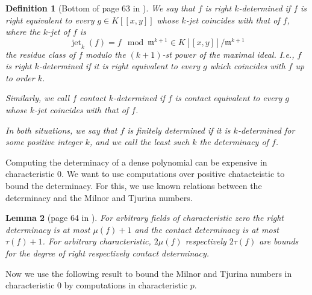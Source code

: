 \documentclass[a4paper,11pt,reqno]{amsart}%
\theoremstyle{definition}
\theoremstyle{plain}
\newtheorem{definition}{Definition}[section]
\newtheorem{lemma}[definition]{Lemma}
\theoremstyle{remark}
\begin{document}
\begin{definition}[Bottom of page 63 in \cite{Boubakri2012}]
We say that \( f \) is \emph{right \( k \)-determined} if \( f \) is right equivalent to every \( g \in K[[x,y]] \) whose \( k \)-jet coincides with that of \( f \), where the \( k \)-jet of \( f \) is
\[
\operatorname{jet}_k(f) = f \mod \mathfrak{m}^{k+1} \in K[[x,y]] / \mathfrak{m}^{k+1}
\]
the residue class of \( f \) modulo the \( (k+1) \)-st power of the maximal ideal. I.e., \( f \) is right \( k \)-determined if it is right equivalent to every \( g \) which coincides with \( f \) up to order \( k \).

Similarly, we call \( f \) \emph{contact \( k \)-determined} if \( f \) is contact equivalent to every \( g \) whose \( k \)-jet coincides with that of \( f \).

In both situations, we say that \( f \) is \emph{finitely determined} if it is \( k \)-determined for some positive integer \( k \), and we call the least such \( k \) the \emph{determinacy} of \( f \).
\end{definition}



%

Computing the determinacy of a dense polynomial can be expensive in characteristic 0. We want to use computations over positive chatacteistic to bound the determinacy. For this, we use known relations between the determinacy and the Milnor and Tjurina numbers.

\begin{lemma}[page 64 in \cite{Boubakri2012}]
For arbitrary fields of characteristic zero the right determinacy is at most $\mu(f) + 1$ and the contact determinacy is at
most $\tau(f)+1$. For arbitrary characteristic, $2\mu(f)$ respectively $2\tau(f)$ are bounds for the degree of right respectively
contact determinacy.
\end{lemma}

Now we use the following result to bound the Milnor and Tjurina numbers in characteristic 0 by computations in characteristic $p$.
\end{document}
